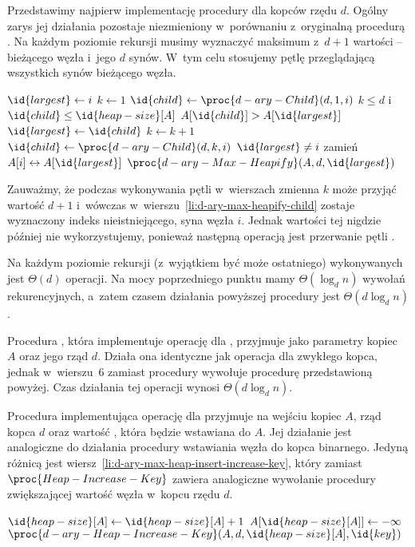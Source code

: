 \subproblem %
Przedstawimy najpierw implementację procedury  dla kopców rzędu $d$. Ogólny zarys jej działania pozostaje niezmieniony w~porównaniu z~oryginalną procedurą . Na każdym poziomie rekursji musimy wyznaczyć maksimum z~$d+1$ wartości -- bieżącego węzła i~jego $d$ synów. W~tym celu stosujemy pętlę przeglądającą wszystkich synów bieżącego węzła.
\begin{codebox}
\li	$\id{largest}\gets i$
\li	$k\gets1$
\li	$\id{child}\gets\proc{d-ary-Child}(d,1,i)$
\li	\While $k\le d$ i~$\id{child}\le\id{heap-size}[A]$ \label{li:d-ary-max-heapify-while-begin}
\li		\Do
			\If $A[\id{child}]>A[\id{largest}]$
\li				\Then $\id{largest}\gets\id{child}$
				\End
\li			$k\gets k+1$
\li			$\id{child}\gets\proc{d-ary-Child}(d,k,i)$ \label{li:d-ary-max-heapify-child}
		\End \label{li:d-ary-max-heapify-while-end}
\li	\If $\id{largest}\ne i$
\li		\Then
			zamień $A[i]\leftrightarrow A[\id{largest}]$
\li			$\proc{d-ary-Max-Heapify}(A,d,\id{largest})$
		\End
\end{codebox}
Zauważmy, że podczas wykonywania pętli  w~wierszach \twodashes{\ref{li:d-ary-max-heapify-while-begin}}{\ref{li:d-ary-max-heapify-while-end}} zmienna $k$ może przyjąć wartość $d+1$ i~wówczas w~wierszu~\ref{li:d-ary-max-heapify-child} zostaje wyznaczony indeks nieistniejącego,  syna węzła $i$. Jednak wartości tej nigdzie później nie wykorzystujemy, ponieważ następną operacją jest przerwanie pętli .

Na każdym poziomie rekursji (z~wyjątkiem być może ostatniego) wykonywanych jest $\Theta(d)$ operacji. Na mocy poprzedniego punktu mamy $\Theta(\log_dn)$ wywołań rekurencyjnych, a~zatem czasem działania powyższej procedury jest $\Theta(d\log_dn)$.

Procedura , która implementuje operację  dla , przyjmuje jako parametry kopiec $A$ oraz jego rząd $d$. Działa ona identyczne jak operacja  dla zwykłego kopca, jednak w~wierszu~6 zamiast procedury  wywołuje procedurę  przedstawioną powyżej. Czas działania tej operacji wynosi $\Theta(d\log_dn)$.

\subproblem %
Procedura  implementująca operację  dla  przyjmuje na wejściu kopiec $A$, rząd kopca $d$ oraz wartość , która będzie wstawiana do $A$. Jej działanie jest analogiczne do działania procedury wstawiania węzła do kopca binarnego. Jedyną różnicą jest wiersz~\ref{li:d-ary-max-heap-insert-increase-key}, który zamiast $\proc{Heap-Increase-Key}$ zawiera analogiczne wywołanie procedury  zwiększającej wartość węzła w~kopcu rzędu $d$.
\begin{codebox}
\li	$\id{heap-size}[A]\gets\id{heap-size}[A]+1$
\li	$A[\id{heap-size}[A]]\gets-\infty$
\li	$\proc{d-ary-Heap-Increase-Key}(A,d,\id{heap-size}[A],\id{key})$ \label{li:d-ary-max-heap-insert-increase-key}
\end{codebox}

